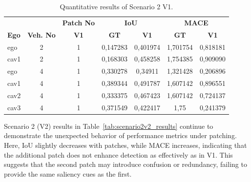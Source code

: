 \begin{table}[H]
    \centering
    \caption{Quantitative results of Scenario 2 V1.}
    \label{tab:scenario2v1_results}
    \begin{adjustbox}{max width=\textwidth}
        \begin{tabularx}{\textwidth}{l c c c c c c}
            \toprule
                &             &   \multicolumn{1}{c}{\textbf{Patch No}}  & \multicolumn{2}{c}{\textbf{IoU}} & \multicolumn{2}{c}{\textbf{MACE}}                            \\
            \cmidrule(lr){4-5}\cmidrule(lr){6-7}
            \textbf{Ego}           &
            \textbf{Veh. No}       &
            \textbf{V1}      &
            \textbf{GT}            & \textbf{V1}  &
            \textbf{GT}            & \textbf{V1}  \\
            \midrule %
            ego        & 2  & 1 & 0,147283 & 0,401974 & 1,701754 & 0,818181 \\
            cav1         & 2  & 1 & 0,168303 & 0,458258 & 1,754385 & 0,909090 \\
            \midrule
            ego        & 4  & 1 & 0,330278 & 0,34911 & 1,321428 & 0,206896  \\
            cav1         & 4  & 1 & 0,389344 & 0,491787 & 1,607142 & 0,896551 \\
            cav2        & 4  & 1 & 0,333375 & 0,467423 & 1,607142 & 0,724137 \\
            cav3        & 4  & 1 & 0,371549 & 0,422417 & 1,75 & 0,241379 \\
            \bottomrule
        \end{tabularx}
    \end{adjustbox}
\end{table}

Scenario 2 (V2) results in Table~\ref{tab:scenario2v2_results} continue to demonstrate the unexpected behavior of performance metrics under patching.
Here, IoU slightly decreases with patches, while MACE increases, indicating that the additional patch does not enhance detection as effectively as in V1.
This suggests that the second patch may introduce confusion or redundancy, failing to provide the same saliency cues as the first.

